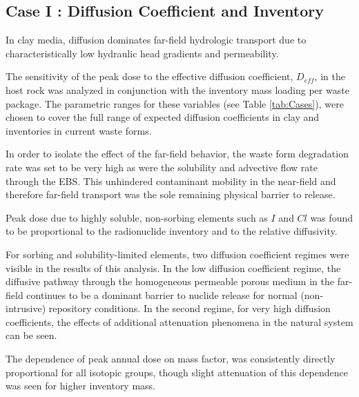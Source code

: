 
\subsection{Case I : Diffusion Coefficient and Inventory }
\label{sec:diffusivity}

In clay media, diffusion dominates far-field hydrologic transport due to 
characteristically low hydraulic head gradients and permeability. 

The sensitivity of the peak dose to the effective diffusion coefficient, 
$D_{eff}$, in the host rock was analyzed in conjunction with the inventory mass 
loading per waste package. The parametric ranges for these variables (see Table 
\ref{tab:Cases}), were chosen to cover the full range of expected diffusion 
coefficients in clay and inventories in current waste forms.

In order to isolate the effect of the far-field behavior, the waste form 
degradation rate was set to be very high as were the solubility and advective 
flow rate through the  \gls{EBS}. This unhindered contaminant mobility in the 
near-field and therefore far-field transport was the sole remaining physical 
barrier to release.

Peak dose due to highly soluble, non-sorbing elements such as $I$ and $Cl$ 
was found to be proportional to the radionuclide inventory and 
to the relative diffusivity. 

For sorbing and solubility-limited elements,
two diffusion coefficient regimes were visible in the results of this analysis. 
In the low diffusion coefficient regime, the diffusive pathway through the 
homogeneous permeable porous medium in the far-field continues to be a  dominant 
barrier to nuclide release for normal (non-intrusive) repository conditions.  
In the second regime, for very high diffusion coefficients, the effects of 
additional attenuation phenomena in the natural system can be seen. 

The dependence of peak annual dose on mass factor, was consistently directly proportional for all isotopic groups, 
though slight attenuation of this dependence was seen for higher inventory mass.
